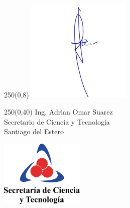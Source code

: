 \documentclass[a4paper,11pt]{letter}
\begin{document}
\begin{landscape}
\begin{textblock}{250}(0,8)
\phantom{.} \hfill \includegraphics[width=5cm]{secretarioCyT.png}\hspace{2cm}\phantom{.} \\[-2cm]
\end{textblock}
\begin{textblock}{250}(0,40)
 \phantom{.} \hfill Ing. Adrian Omar Suarez \hspace{2.5cm}\phantom{.}\\ \small
\phantom{.} \hfill Secretario de Ciencia y Tecnología \hspace{2.5cm}\phantom{.}\\
\phantom{.} \hfill Santiago del Estero \hspace{2.5cm}\phantom{.}\\
\end{textblock}

\vfill
\centering
 \includegraphics[width=4cm]{logo-secretaria.png}


\end{landscape}
\end{document}
